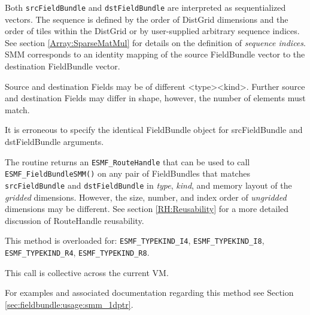    Both {\tt srcFieldBundle} and {\tt dstFieldBundle} are interpreted as sequentialized
   vectors. The
   sequence is defined by the order of DistGrid dimensions and the order of
   tiles within the DistGrid or by user-supplied arbitrary sequence indices. See
   section \ref{Array:SparseMatMul} for details on the definition of {\em sequence indices}.
   SMM corresponds to an identity mapping of the source FieldBundle vector to
   the destination FieldBundle vector.
  
   Source and destination Fields may be of different <type><kind>. Further source
   and destination Fields may differ in shape, however, the number of elements
   must match.
  
   It is erroneous to specify the identical FieldBundle object for srcFieldBundle
   and dstFieldBundle arguments.
  
   The routine returns an {\tt ESMF\_RouteHandle} that can be used to call
   {\tt ESMF\_FieldBundleSMM()} on any pair of FieldBundles that matches
   {\tt srcFieldBundle} and {\tt dstFieldBundle} in {\em type}, {\em kind},
   and memory layout of the {\em gridded} dimensions. However, the size,
   number, and index order of {\em ungridded} dimensions may be different.
   See section \ref{RH:Reusability} for a more detailed discussion of
   RouteHandle reusability.
  
   This method is overloaded for:\newline
   {\tt ESMF\_TYPEKIND\_I4}, {\tt ESMF\_TYPEKIND\_I8},\newline
   {\tt ESMF\_TYPEKIND\_R4}, {\tt ESMF\_TYPEKIND\_R8}.
   \newline
  
   This call is collective across the current VM.
  
   For examples and associated documentation regarding this method see Section
   \ref{sec:fieldbundle:usage:smm_1dptr}.
  
